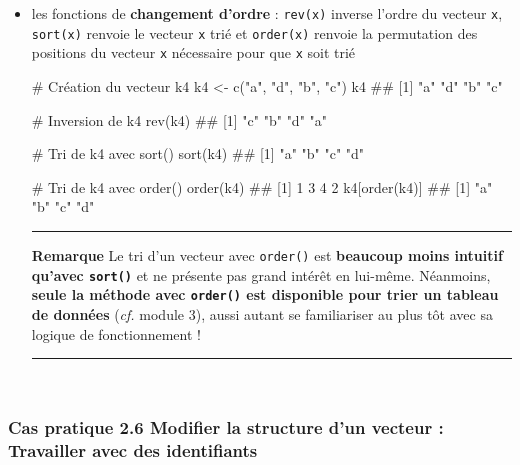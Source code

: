 \documentclass[12pt,twosided, notitlepage]{book}
\newenvironment{Shaded}{}{}
\newcommand{\KeywordTok}[1]{\textcolor[rgb]{0.00,0.00,1.00}{{#1}}}
\newcommand{\StringTok}[1]{\textcolor[rgb]{0.00,0.50,0.50}{{#1}}}
\newcommand{\CommentTok}[1]{\textcolor[rgb]{0.00,0.50,0.00}{{#1}}}
\newcommand{\NormalTok}[1]{{#1}}
\renewenvironment{Shaded}{\begin{snugshade}}{\end{snugshade}}
\begin{document}
\begin{itemize}
\item
  les fonctions de \textbf{changement d'ordre} :
  \texttt{rev(x)} inverse l'ordre du vecteur
  \texttt{x}, \texttt{sort(x)} renvoie le
  vecteur \texttt{x} trié et
  \texttt{order(x)} renvoie la permutation
  des positions du vecteur \texttt{x} nécessaire pour que \texttt{x}
  soit trié

\begin{Shaded}
\begin{Highlighting}[]
\CommentTok{# Création du vecteur k4}
\NormalTok{k4 <-}\StringTok{ }\KeywordTok{c}\NormalTok{(}\StringTok{"a"}\NormalTok{, }\StringTok{"d"}\NormalTok{, }\StringTok{"b"}\NormalTok{, }\StringTok{"c"}\NormalTok{)}
\NormalTok{k4}
  \NormalTok{## [1] "a" "d" "b" "c"}

\CommentTok{# Inversion de k4}
\KeywordTok{rev}\NormalTok{(k4)}
  \NormalTok{## [1] "c" "b" "d" "a"}

\CommentTok{# Tri de k4 avec sort()}
\KeywordTok{sort}\NormalTok{(k4)}
  \NormalTok{## [1] "a" "b" "c" "d"}

\CommentTok{# Tri de k4 avec order()}
\KeywordTok{order}\NormalTok{(k4)}
  \NormalTok{## [1] 1 3 4 2}
\NormalTok{k4[}\KeywordTok{order}\NormalTok{(k4)]}
  \NormalTok{## [1] "a" "b" "c" "d"}
\end{Highlighting}
\end{Shaded}

  \begin{center}\rule{0.5\linewidth}{\linethickness}\end{center}

  \textbf{Remarque} Le tri d'un vecteur avec \texttt{order()} est
  \textbf{beaucoup moins intuitif qu'avec \texttt{sort()}} et ne
  présente pas grand intérêt en lui-même. Néanmoins, \textbf{seule la
  méthode avec \texttt{order()} est disponible pour trier un tableau de
  données} (\emph{cf.} module 3), aussi autant se familiariser au plus
  tôt avec sa logique de fonctionnement !

  \begin{center}\rule{0.5\linewidth}{\linethickness}\end{center}
\end{itemize}

~

\subsubsection{\texorpdfstring{\textbf{Cas pratique 2.6} Modifier la
structure d'un vecteur : Travailler avec des
identifiants}{Cas pratique 2.6 Modifier la structure d'un vecteur : Travailler avec des identifiants}}\label{cas-pratique-2.6-modifier-la-structure-dun-vecteur-travailler-avec-des-identifiants}
\end{document}
